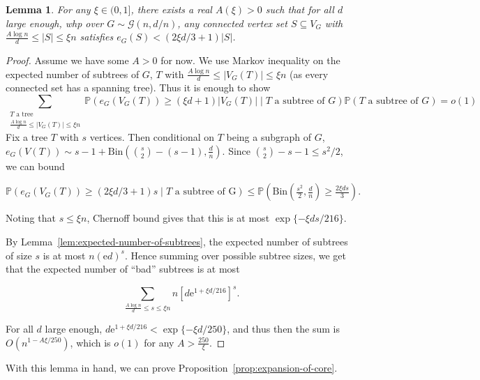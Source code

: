 \documentclass[11pt]{article}
\theoremstyle{plain}
\newtheorem{lemma}[theorem]{Lemma}
\newcommand{\G}{\mathcal{G}}
\newcommand{\emm}{\mathrm{e}}
\renewcommand{\P}{\mathds{P}}
\newcommand{\1}{\mathbb{1}}
\newcommand{\Bin}{\text{Bin}}
\begin{document}
\begin{lemma}\label{lem:not-too-many-internal-edges}
    For any \(\xi\in(0, 1]\), there exists a real \(A(\xi) > 0\) such that for all \(d\) large enough, whp over \(G\sim\G(n,d/n)\), any connected vertex set \(S\subseteq V_G\) with  \(\frac{A\log n}{d}\leq |S|\leq \xi n\) satisfies \(e_G(S) < (2\xi d/3 + 1)|S|\).
\end{lemma}
\begin{proof}
    Assume we have some \(A > 0\) for now. We use Markov inequality on the expected number of subtrees of \(G\), \(T\) with \(\frac{A\log n}{d}\leq |V_G(T)| \leq \xi n\) (as every connected set has a spanning tree). Thus it is enough to show 
    \[
    \sum_{\substack{T\text{ a tree}\\ \frac{A\log n}{d}\leq |V_G(T)|\leq \xi n}} \P(e_G(V_G(T)) \geq (\xi d + 1)|V_G(T)| \mid T\text{ a subtree of }G) \P(T\text{ a subtree of }G) = o(1)
    \]
    Fix a tree \(T\) with \(s\) vertices. Then conditional on \(T\) being a subgraph of \(G\), \(e_G(V(T))\sim s-1+\Bin(\binom s2 - (s-1),\tfrac dn)\). Since \(\binom s2 - s-1 \leq s^2 / 2\), we can bound

    \[
    \P(e_G(V_G(T)) \geq (2\xi d/3 + 1)s \mid T\text{ a subtree of G}) \leq \P(\Bin(\tfrac{s^2}{2}, \tfrac dn)\geq \tfrac{2\xi ds}{3}).
    \]

    Noting that \(s\leq \xi n\), Chernoff bound gives that
this is at most \(\exp\{-\xi ds / 216\}\).

    By Lemma~\ref{lem:expected-number-of-subtrees}, the expected number of subtrees of size \(s\) is at most \(n(\emm d)^s\). Hence summing over possible subtree sizes, we get that the expected number of ``bad'' subtrees is at most

    \[
    \sum_{\frac{A\log n}{d}\leq s\leq \xi n} n[d\emm^{1+\xi d/216}]^s.
    \]

    For all \(d\) large enough, \(d\emm^{1+\xi d/216} < \exp\{-\xi d / 250\}\), and thus then the sum is \(O(n^{1-A \xi / 250})\), which is \(o(1)\) for any \(A > \tfrac{250}{\xi}\).
\end{proof}

With this lemma in hand, we can prove Proposition~\ref{prop:expansion-of-core}.
\end{document}
